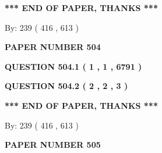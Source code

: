 \documentclass[12pt]{article}
\begin{document}
  
   
   
 \vspace{0.2in}
 
   
   
   
   
\vspace{1.0in} 
{\textbf{\large{ *** END OF PAPER, THANKS *** }}} 
   
   
\hspace{1.0in} By: 
 239 ( 416 ,  613 )
   
   
   
   
\newpage 
\setcounter{page}{ 
   504001 } 
   
   
   
   
 {\textbf{ \Large{ PAPER NUMBER  504  }}}
   
   
\vspace{0.2in}
   
   
   
   
   
   
 \vspace{0.2in}
 
 
 
 
   
   
  
\vspace{0.2in}
  
{\textbf{\Large{QUESTION
504.1 
 ( 1 , 1 , 6791 )
}}}
  
  
  
\vspace{0.2in}
  
{\textbf{\Large{QUESTION
504.2 
 ( 2 , 2 , 3 )
}}}
  
  
   
   
 \vspace{0.2in}
 
   
   
   
   
\vspace{1.0in} 
{\textbf{\large{ *** END OF PAPER, THANKS *** }}} 
   
   
\hspace{1.0in} By: 
 239 ( 416 ,  613 )
   
   
   
   
\newpage 
\setcounter{page}{ 
   505001 } 
   
   
   
   
 {\textbf{ \Large{ PAPER NUMBER  505  }}}
   
\end{document}
